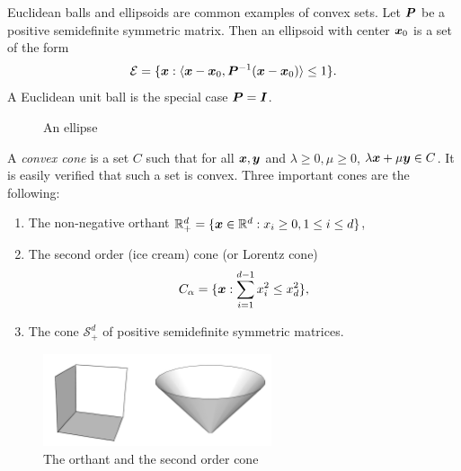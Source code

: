 \begin{example}
 Euclidean balls and ellipsoids are common examples of convex sets. Let $\bm{P}$ be a positive semidefinite symmetric matrix. Then an ellipsoid with center $\bm{x}_0$ is a set of the form
 \begin{equation*}
  \mathcal{E} = \{\bm{x} \mathrel{\mathop{:}} \langle {\bm{x}-\bm{x}_0}, {\bm{P}^{-1}(\bm{x}-\bm{x}_0)} \rangle\leq 1\}.
 \end{equation*}
A Euclidean unit ball is the special case $\bm{P}=\bm{I}$.
\begin{figure}[h!]
\centering
{}
\caption{An ellipse}
\end{figure}
\end{example}

\begin{example}
 A {\em convex cone} is a set $C$ such that for all $\bm{x},\bm{y}$ and $\lambda\geq 0, \mu\geq 0$,
 $\lambda \bm{x}+\mu \bm{y}\in C$. It is easily verified that such a set is convex. Three important cones are the following:
 \begin{enumerate}
  \item The non-negative orthant $\mathbb{R}^d_{+}=\{\bm{x}\in \mathbb{R}^d \mathrel{\mathop{:}} x_i\geq 0, 1\leq i\leq d\}$,
  \item The second order (ice cream) cone (or Lorentz cone)
  \begin{equation*}
   C_{\alpha} = \{\bm{x} \mathrel{\mathop{:}} \sum_{i=1}^{d-1}x_i^2\leq x_d^2\},
  \end{equation*}
  \item The cone $\mathcal{S}_{+}^d$ of positive semidefinite symmetric matrices.
 \end{enumerate}
\begin{figure}[h!]
\centering
 \includegraphics[width=0.6\textwidth]{images/cones.png}
 \caption{The orthant and the second order cone}
\end{figure}

\end{example}


